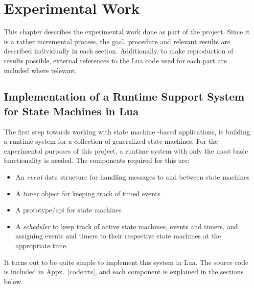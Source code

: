 \chapter{Experimental Work}
\label{ch:experimental_work}
This chapter describes the experimental work done as part of the project. Since it is a rather incremental process, the goal, procedure and relevant results are described individually in each section. Additionally, to make reproduction of results possible, external references to the Lua code used for each part are included where relevant.

\section{Implementation of a Runtime Support System for State Machines in Lua}
\label{sec:impl_runtime_support}
The first step towards working with state machine -based applications, is building a runtime system for a collection of generalized state machines. For the experimental purposes of this project, a runtime system with only the most basic functionality is needed. The components required for this are:

\begin{itemize}
	\item An \emph{event} data structure for handling messages to and between state machines
	\item A \emph{timer} object for keeping track of timed events
	\item A prototype/\gls{api} for state machines
	\item A \emph{scheduler} to keep track of active state machines, events and timers, and assigning events and timers to their respective state machines at the appropriate time.
\end{itemize}

\noindent
It turns out to be quite simple to implement this system in Lua. The source code is included in Appx.~\ref{code:rts}, and each component is explained in the sections below.

